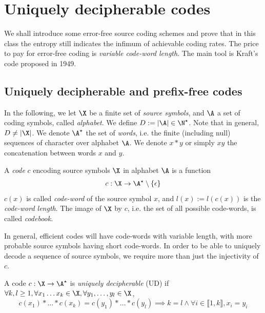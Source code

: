 \documentclass[toc, titlepaged]{../cs-classes/cs-classes}
\begin{document}
\section{Uniquely decipherable codes}
We shall introduce some error-free source coding schemes and prove
that in this class the entropy still indicates the infimum of achievable coding rates. The price to pay for error-free coding is \emph{variable code-word length}. The main tool is Kraft's code proposed in 1949.

\subsection{Uniquely decipherable and prefix-free codes}
In the following, we let $\X$ be a finite set of \emph{source symbols}, and $\A$ a set of coding symbols, called \emph{alphabet}. We define $D:=|\A|\in\N^\star$. Note that in general, $D\neq|\X|$. We denote $\A^\star$ the set of \emph{words}, i.e. the finite (including null) sequences of character over alphabet $\A$. We denote $x*y$ or simply $xy$ the concatenation between words $x$ and $y$.

\begin{definition}[Code]
    A \emph{code} $c$ encoding source symbols $\X$ in alphabet $\A$ is a function
    \begin{equation*}
            c: \X\to \A^\star\setminus\{\epsilon\}
    \end{equation*}
    $c(x)$ is called \emph{code-word} of the source symbol $x$, and $l(x):=l(c(x))$ is the \emph{code-word length}. The image of $\X$ by $c$, i.e. the set of all possible code-words, is called \emph{codebook}.
\end{definition}
In general, efficient codes will have code-words with variable length, with more probable source symbols having short code-words. In order to be able to uniquely decode a sequence of source symbols, we require more than just the injectivity of $c$.

\begin{definition}
    A code $c: \X\to\A^\star$ is \emph{uniquely decipherable} (UD) if $\forall k, l \geq 1, \forall x_1\dots x_k\in \X, \forall y_1, \dots, y_l\in \X$,
    \begin{equation*}
        c(x_1)*\dots*c(x_k)=c(y_1)*\dots*c(y_l) \implies k=l \land \forall i\in\llbracket 1, k\rrbracket, x_i=y_i
    \end{equation*}
\end{definition}
\end{document}
